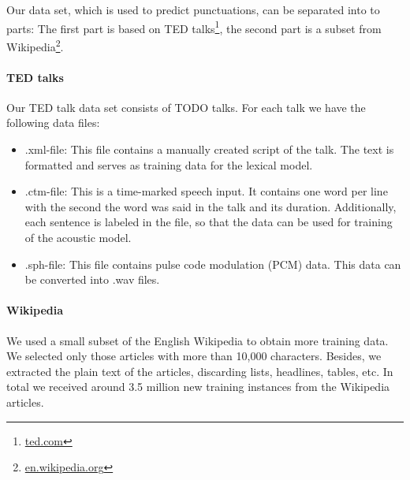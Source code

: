 
Our data set, which is used to predict punctuations, can be separated into to parts:
The first part is based on TED talks\footnote{\url{ted.com}}, the second part is a subset from Wikipedia\footnote{\url{en.wikipedia.org}}.

\paragraph{TED talks} Our TED talk data set consists of TODO talks. For each talk we have the following data files:
\begin{itemize}
	\item .xml-file: This file contains a manually created script of the talk.
	The text is formatted and serves as training data for the lexical model.
	\item .ctm-file: This is a time-marked speech input.
	It contains one word per line with the second the word was said in the talk and its duration.
	Additionally, each sentence is labeled in the file, so that the data can be used for training of the acoustic model.
	\item .sph-file: This file contains pulse code modulation (PCM) data.
	This data can be converted into .wav files.
\end{itemize}

\paragraph{Wikipedia} We used a small subset of the English Wikipedia to obtain more training data.
We selected only those articles with more than 10,000 characters.
Besides, we extracted the plain text of the articles, discarding lists, headlines, tables, etc.
In total we received around 3.5 million new training instances from the Wikipedia articles.
